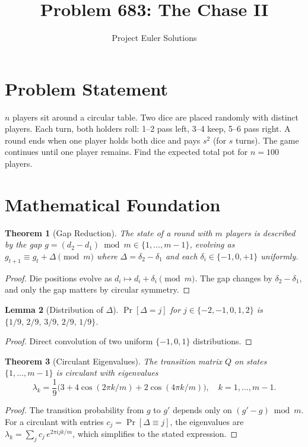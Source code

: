 \documentclass[11pt]{article}
\title{Problem 683: The Chase II}
\author{Project Euler Solutions}
\date{}
\newtheorem{theorem}{Theorem}
\newtheorem{lemma}[theorem]{Lemma}
\begin{document}
\maketitle

\section{Problem Statement}

$n$ players sit around a circular table. Two dice are placed randomly with distinct players. Each turn, both holders roll: 1--2 pass left, 3--4 keep, 5--6 pass right. A round ends when one player holds both dice and pays $s^2$ (for $s$ turns). The game continues until one player remains. Find the expected total pot for $n=100$ players.

\section{Mathematical Foundation}

\begin{theorem}[Gap Reduction]
The state of a round with $m$ players is described by the gap $g = (d_2 - d_1)\bmod m \in \{1,\ldots,m-1\}$, evolving as $g_{t+1} \equiv g_t + \Delta \pmod{m}$ where $\Delta = \delta_2-\delta_1$ and each $\delta_i \in \{-1,0,+1\}$ uniformly.
\end{theorem}

\begin{proof}
Die positions evolve as $d_i \mapsto d_i + \delta_i \pmod{m}$. The gap changes by $\delta_2-\delta_1$, and only the gap matters by circular symmetry.
\end{proof}

\begin{lemma}[Distribution of $\Delta$]
$\Pr[\Delta = j]$ for $j \in \{-2,-1,0,1,2\}$ is $\{1/9,\, 2/9,\, 3/9,\, 2/9,\, 1/9\}$.
\end{lemma}

\begin{proof}
Direct convolution of two uniform $\{-1,0,1\}$ distributions.
\end{proof}

\begin{theorem}[Circulant Eigenvalues]
The transition matrix $Q$ on states $\{1,\ldots,m-1\}$ is circulant with eigenvalues
\[
\lambda_k = \frac{1}{9}\bigl(3 + 4\cos(2\pi k/m) + 2\cos(4\pi k/m)\bigr), \quad k=1,\ldots,m-1.
\]
\end{theorem}

\begin{proof}
The transition probability from $g$ to $g'$ depends only on $(g'-g)\bmod m$. For a circulant with entries $c_j = \Pr[\Delta\equiv j]$, the eigenvalues are $\lambda_k = \sum_j c_j\,e^{2\pi ijk/m}$, which simplifies to the stated expression.
\end{proof}
\end{document}

